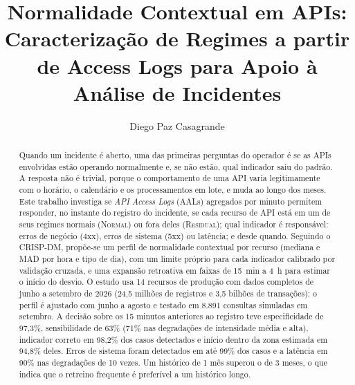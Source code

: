 \documentclass[sigconf,nonacm]{acmart}
\newcommand{\Normal}{\textsc{Normal}\xspace}
\newcommand{\Residual}{\textsc{Residual}\xspace}
\begin{document}
\title{Normalidade Contextual em APIs: Caracterização de Regimes a partir de Access Logs para Apoio à Análise de Incidentes}

\author{Diego Paz Casagrande}

\renewcommand{\shortauthors}{D. P. Casagrande}

\begin{abstract}
Quando um incidente é aberto, uma das primeiras perguntas do operador é se as APIs envolvidas estão operando normalmente e, se não estão, qual indicador saiu do padrão. A resposta não é trivial, porque o comportamento de uma API varia legitimamente com o horário, o calendário e os processamentos em lote, e muda ao longo dos meses. Este trabalho investiga se \emph{API Access Logs} (AALs) agregados por minuto permitem responder, no instante do registro do incidente, se cada recurso de API está em um de seus regimes normais (\Normal) ou fora deles (\Residual); qual indicador é responsável: erros de negócio (4xx), erros de sistema (5xx) ou latência; e desde quando. Seguindo o CRISP-DM, propõe-se um perfil de normalidade contextual por recurso (mediana e MAD por hora e tipo de dia), com um limite próprio para cada indicador calibrado por validação cruzada, e uma expansão retroativa em faixas de 15~min a 4~h para estimar o início do desvio. O estudo usa 14 recursos de produção com dados completos de junho a setembro de 2026 (24,5 milhões de registros e 3,5 bilhões de transações): o perfil é ajustado com junho a agosto e testado em 8.891 consultas simuladas em setembro. A decisão sobre os 15 minutos anteriores ao registro teve especificidade de 97,3\%, sensibilidade de 63\% (71\% nas degradações de intensidade média e alta), indicador correto em 98,2\% dos casos detectados e início dentro da zona estimada em 94,8\% deles. Erros de sistema foram detectados em até 99\% dos casos e a latência em 90\% nas degradações de 10 vezes. Um histórico de 1 mês superou o de 3 meses, o que indica que o retreino frequente é preferível a um histórico longo.
\end{abstract}


\maketitle
\end{document}
